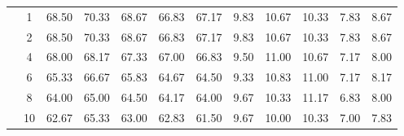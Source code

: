 \begin{table}[H]
\begin{tabular}{|c|c|c c c c c|c c c c c|}
\multicolumn{1}{|c|}{ \multirow{6}{*}{\rotatebox[origin=c]{90}{\textbf{K-vizinhos}}} }
&1	&68.50	&70.33	&68.67	&66.83	&67.17	&9.83	&10.67	&10.33	&7.83	&8.67 \\\cline{2-12}
&2	&68.50	&70.33	&68.67	&66.83	&67.17	&9.83	&10.67	&10.33	&7.83	&8.67 \\\cline{2-12}
&4	&68.00	&68.17	&67.33	&67.00	&66.83	&9.50	&11.00	&10.67	&7.17	&8.00 \\\cline{2-12}
&6	&65.33	&66.67	&65.83	&64.67	&64.50	&9.33	&10.83	&11.00	&7.17	&8.17 \\\cline{2-12}
&8	&64.00	&65.00	&64.50	&64.17	&64.00	&9.67	&10.33	&11.17	&6.83	&8.00 \\\cline{2-12}
&10	&62.67	&65.33	&63.00	&62.83	&61.50	&9.67	&10.00	&10.33	&7.00	&7.83 \\\midrule

	\end{tabular}
\end{table}







